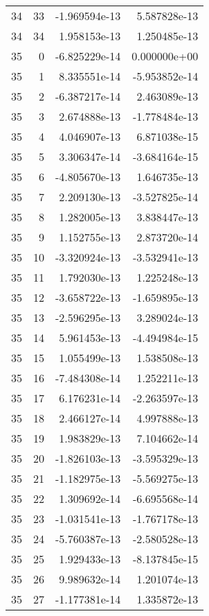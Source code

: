 \begin{tabular}{rrrr}
  34 &   33 & -1.969594e-13 &  5.587828e-13 \\
  34 &   34 &  1.958153e-13 &  1.250485e-13 \\
  35 &    0 & -6.825229e-14 &  0.000000e+00 \\
  35 &    1 &  8.335551e-14 & -5.953852e-14 \\
  35 &    2 & -6.387217e-14 &  2.463089e-13 \\
  35 &    3 &  2.674888e-13 & -1.778484e-13 \\
  35 &    4 &  4.046907e-13 &  6.871038e-15 \\
  35 &    5 &  3.306347e-14 & -3.684164e-15 \\
  35 &    6 & -4.805670e-13 &  1.646735e-13 \\
  35 &    7 &  2.209130e-13 & -3.527825e-14 \\
  35 &    8 &  1.282005e-13 &  3.838447e-13 \\
  35 &    9 &  1.152755e-13 &  2.873720e-14 \\
  35 &   10 & -3.320924e-13 & -3.532941e-13 \\
  35 &   11 &  1.792030e-13 &  1.225248e-13 \\
  35 &   12 & -3.658722e-13 & -1.659895e-13 \\
  35 &   13 & -2.596295e-13 &  3.289024e-13 \\
  35 &   14 &  5.961453e-13 & -4.494984e-15 \\
  35 &   15 &  1.055499e-13 &  1.538508e-13 \\
  35 &   16 & -7.484308e-14 &  1.252211e-13 \\
  35 &   17 &  6.176231e-14 & -2.263597e-13 \\
  35 &   18 &  2.466127e-14 &  4.997888e-13 \\
  35 &   19 &  1.983829e-13 &  7.104662e-14 \\
  35 &   20 & -1.826103e-13 & -3.595329e-13 \\
  35 &   21 & -1.182975e-13 & -5.569275e-13 \\
  35 &   22 &  1.309692e-14 & -6.695568e-14 \\
  35 &   23 & -1.031541e-13 & -1.767178e-13 \\
  35 &   24 & -5.760387e-13 & -2.580528e-13 \\
  35 &   25 &  1.929433e-13 & -8.137845e-15 \\
  35 &   26 &  9.989632e-14 &  1.201074e-13 \\
  35 &   27 & -1.177381e-14 &  1.335872e-13 \\

\end{tabular}
